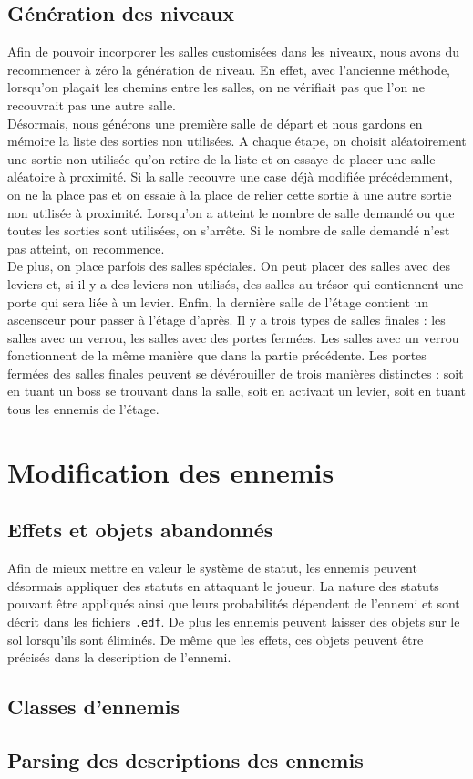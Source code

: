 \documentclass[10pt,a4paper]{article}
\begin{document}
\subsection{Génération des niveaux}

Afin de pouvoir incorporer les salles customisées dans les niveaux, nous avons du recommencer à zéro la génération de niveau. En effet, avec l'ancienne méthode, lorsqu'on plaçait les chemins entre les salles, on ne vérifiait pas que l'on ne recouvrait pas une autre salle.\\
Désormais, nous générons une première salle de départ et nous gardons en mémoire la liste des sorties non utilisées. A chaque étape, on choisit aléatoirement une sortie non utilisée qu'on retire de la liste et on essaye de placer une salle aléatoire à proximité. Si la salle recouvre une case déjà modifiée précédemment, on ne la place pas et on essaie à la place de relier cette sortie à une autre sortie non utilisée à proximité. Lorsqu'on a atteint le nombre de salle demandé ou que toutes les sorties sont utilisées, on s'arrête. Si le nombre de salle demandé n'est pas atteint, on recommence.\\
De plus, on place parfois des salles spéciales. On peut placer des salles avec des leviers et, si il y a des leviers non utilisés, des salles au trésor qui contiennent une porte qui sera liée à un levier. Enfin, la dernière salle de l'étage contient un ascensceur pour passer à l'étage d'après. Il y a trois types de salles finales : les salles avec un verrou, les salles avec des portes fermées. Les salles avec un verrou fonctionnent de la même manière que dans la partie précédente. Les portes fermées des salles finales peuvent se dévérouiller de trois manières distinctes : soit en tuant un boss se trouvant dans la salle, soit en activant un levier, soit en tuant tous les ennemis de l'étage.\\

\section{Modification des ennemis}
\subsection{Effets et objets abandonnés}
Afin de mieux mettre en valeur le système de statut, les ennemis peuvent désormais appliquer des statuts en attaquant le joueur. La nature des statuts pouvant être appliqués ainsi que leurs probabilités dépendent de l'ennemi et sont décrit dans les fichiers \texttt{.edf}. De plus les ennemis peuvent laisser des objets sur le sol lorsqu'ils sont éliminés. De même que les effets, ces objets peuvent être précisés dans la description de l'ennemi.

\subsection{Classes d'ennemis}

\subsection{Parsing des descriptions des ennemis}
\end{document}
